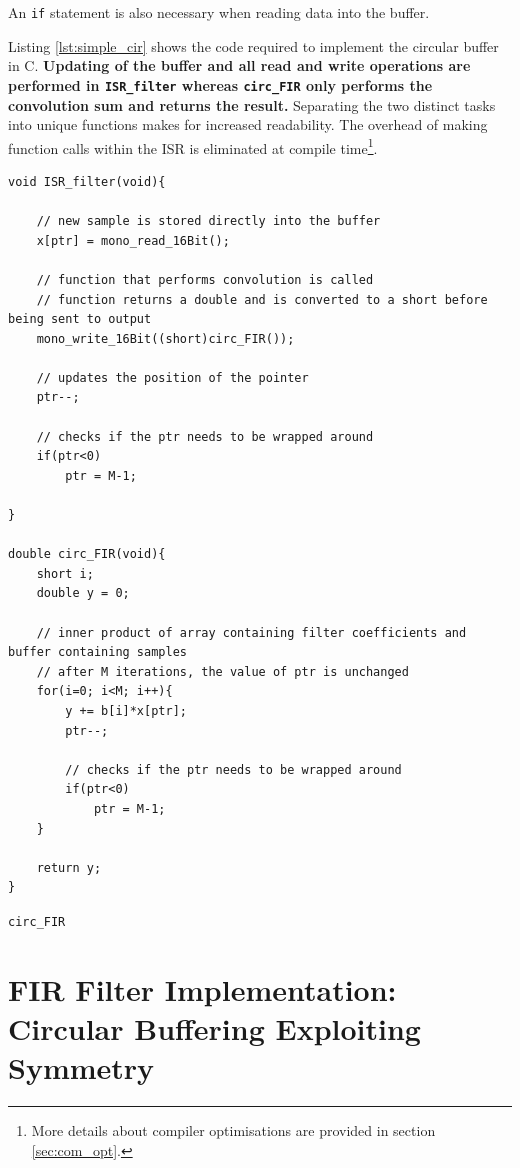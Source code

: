 \documentclass{article}
\begin{document}
An {\tt if} statement is also necessary when reading data into the buffer.

\newpage
Listing \ref{lst:simple_cir} shows the code required to implement the circular buffer in C. \textbf{Updating of the buffer and all read and write operations are performed in {\tt ISR\_filter} whereas {\tt circ\_FIR} only performs the convolution sum and returns the result.} Separating the two distinct tasks into unique functions makes for increased readability. The overhead of making function calls within the ISR is eliminated at compile time\footnote{More details about compiler optimisations are provided in section \ref{sec:com_opt}.}.\\

\begin{listing}[H]
\label{lst:simple_cir}
\begin{verbatim}
void ISR_filter(void){
    
    // new sample is stored directly into the buffer
    x[ptr] = mono_read_16Bit();		
    
    // function that performs convolution is called
    // function returns a double and is converted to a short before being sent to output
    mono_write_16Bit((short)circ_FIR());
    
    // updates the position of the pointer
    ptr--;		
    
    // checks if the ptr needs to be wrapped around
    if(ptr<0)	
        ptr = M-1;	

}			
			
double circ_FIR(void){			
    short i;		
    double y = 0;		
    
    // inner product of array containing filter coefficients and buffer containing samples
    // after M iterations, the value of ptr is unchanged
    for(i=0; i<M; i++){		
        y += b[i]*x[ptr];	
        ptr--;
        
        // checks if the ptr needs to be wrapped around
        if(ptr<0)	
            ptr = M-1;
    }		
    
    return y;		
}			
\end{verbatim}
\caption{{\tt circ\_FIR}}
\end{listing}

\newpage
\section{FIR Filter Implementation: Circular Buffering Exploiting Symmetry}\label{sec:exploit_symmetry}
\end{document}
